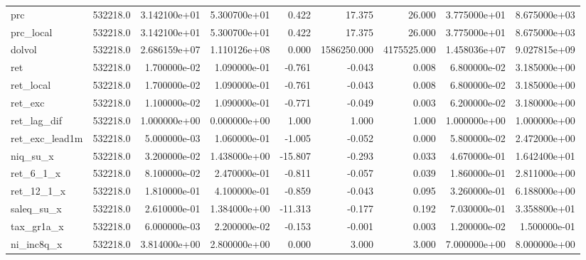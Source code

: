 \documentclass[12pt]{article}
\begin{document}
\begin{landscape}
\begin{longtable}{|l|r|r|r|r|r|r|r|r|}
prc                    &  532218.0 &  3.142100e+01 &  5.300700e+01 &       0.422 &       17.375 &       26.000 &  3.775000e+01 &  8.675000e+03 \\
prc\_local              &  532218.0 &  3.142100e+01 &  5.300700e+01 &       0.422 &       17.375 &       26.000 &  3.775000e+01 &  8.675000e+03 \\
dolvol                 &  532218.0 &  2.686159e+07 &  1.110126e+08 &       0.000 &  1586250.000 &  4175525.000 &  1.458036e+07 &  9.027815e+09 \\
ret                    &  532218.0 &  1.700000e-02 &  1.090000e-01 &      -0.761 &       -0.043 &        0.008 &  6.800000e-02 &  3.185000e+00 \\
ret\_local              &  532218.0 &  1.700000e-02 &  1.090000e-01 &      -0.761 &       -0.043 &        0.008 &  6.800000e-02 &  3.185000e+00 \\
ret\_exc                &  532218.0 &  1.100000e-02 &  1.090000e-01 &      -0.771 &       -0.049 &        0.003 &  6.200000e-02 &  3.180000e+00 \\
ret\_lag\_dif            &  532218.0 &  1.000000e+00 &  0.000000e+00 &       1.000 &        1.000 &        1.000 &  1.000000e+00 &  1.000000e+00 \\
ret\_exc\_lead1m         &  532218.0 &  5.000000e-03 &  1.060000e-01 &      -1.005 &       -0.052 &        0.000 &  5.800000e-02 &  2.472000e+00 \\
niq\_su\_x               &  532218.0 &  3.200000e-02 &  1.438000e+00 &     -15.807 &       -0.293 &        0.033 &  4.670000e-01 &  1.642400e+01 \\
ret\_6\_1\_x              &  532218.0 &  8.100000e-02 &  2.470000e-01 &      -0.811 &       -0.057 &        0.039 &  1.860000e-01 &  2.811000e+00 \\
ret\_12\_1\_x             &  532218.0 &  1.810000e-01 &  4.100000e-01 &      -0.859 &       -0.043 &        0.095 &  3.260000e-01 &  6.188000e+00 \\
saleq\_su\_x             &  532218.0 &  2.610000e-01 &  1.384000e+00 &     -11.313 &       -0.177 &        0.192 &  7.030000e-01 &  3.358800e+01 \\
tax\_gr1a\_x             &  532218.0 &  6.000000e-03 &  2.200000e-02 &      -0.153 &       -0.001 &        0.003 &  1.200000e-02 &  1.500000e-01 \\
ni\_inc8q\_x             &  532218.0 &  3.814000e+00 &  2.800000e+00 &       0.000 &        3.000 &        3.000 &  7.000000e+00 &  8.000000e+00 \\

\end{longtable}
\end{landscape}
\end{document}
